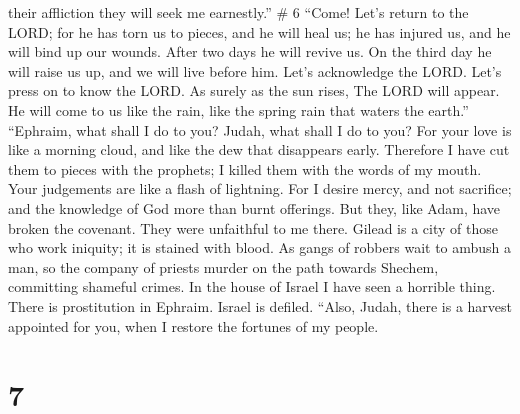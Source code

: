 their affliction they will seek me earnestly.'' \# 6 
``Come! Let's return to the LORD; for he has torn us to pieces, and he
will heal us; he has injured us, and he will bind up our wounds.
 After two days he will revive us. On the third day he
will raise us up, and we will live before him.  Let's
acknowledge the LORD. Let's press on to know the LORD. As surely as the
sun rises, The LORD will appear. He will come to us like the rain, like
the spring rain that waters the earth.''  ``Ephraim, what
shall I do to you? Judah, what shall I do to you? For your love is like
a morning cloud, and like the dew that disappears early. 
Therefore I have cut them to pieces with the prophets; I killed them
with the words of my mouth. Your judgements are like a flash of
lightning.  For I desire mercy, and not sacrifice; and the
knowledge of God more than burnt offerings.  But they,
like Adam, have broken the covenant. They were unfaithful to me there.
 Gilead is a city of those who work iniquity; it is
stained with blood.  As gangs of robbers wait to ambush a
man, so the company of priests murder on the path towards Shechem,
committing shameful crimes.  In the house of Israel I
have seen a horrible thing. There is prostitution in Ephraim. Israel is
defiled.  ``Also, Judah, there is a harvest appointed for
you, when I restore the fortunes of my people.

\hypertarget{section-4}{%
\section{7}\label{section-4}}

